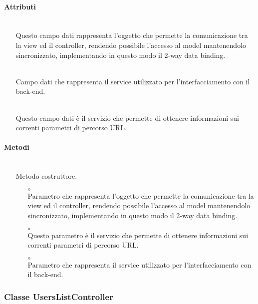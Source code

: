 \paragraph*{Attributi}
\begin{itemize}
\item[]  \\ Questo campo dati rappresenta l'oggetto che permette la comunicazione tra la view ed il controller, rendendo possibile l’accesso al model mantenendolo sincronizzato, implementando in questo modo il 2-way data binding.
\item[]  \\ Campo dati che rappresenta il service utilizzato per l'interfacciamento con il back-end.
\item[]  \\ Questo campo dati è il servizio che permette di ottenere informazioni sui correnti parametri di percorso URL.
\end{itemize}

\paragraph*{Metodi}
\begin{itemize}
\item[]  \\ Metodo costruttore.
\begin{itemize}\addtolength{\itemsep}{-0.5\baselineskip}
\item[$\circ$]  \\ Parametro che rappresenta l'oggetto che permette la comunicazione tra la view ed il controller, rendendo possibile l’accesso al model mantenendolo sincronizzato, implementando in questo modo il 2-way data binding.
\item[$\circ$]  \\ Questo parametro è il servizio che permette di ottenere informazioni sui correnti parametri di percorso URL.
\item[$\circ$]  \\ Parametro che rappresenta il service utilizzato per l'interfacciamento con il back-end.
\end{itemize}
\end{itemize}

\subsubsection{Classe UsersListController}

